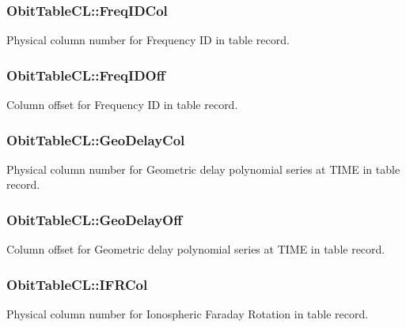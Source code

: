 \subsubsection{ {\bf Obit\-Table\-CL::Freq\-IDCol}}\label{structObitTableCL_o32}


Physical column number for Frequency ID in table record. 

\subsubsection{ {\bf Obit\-Table\-CL::Freq\-IDOff}}\label{structObitTableCL_o31}


Column offset for Frequency ID in table record. 

\subsubsection{ {\bf Obit\-Table\-CL::Geo\-Delay\-Col}}\label{structObitTableCL_o40}


Physical column number for Geometric delay polynomial series at TIME in table record. 

\subsubsection{ {\bf Obit\-Table\-CL::Geo\-Delay\-Off}}\label{structObitTableCL_o39}


Column offset for Geometric delay polynomial series at TIME in table record. 

\subsubsection{ {\bf Obit\-Table\-CL::IFRCol}}\label{structObitTableCL_o34}


Physical column number for Ionospheric Faraday Rotation in table record. 

